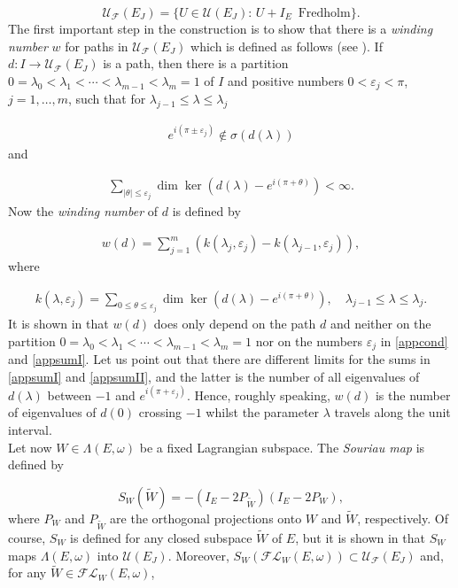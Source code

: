 \documentclass[a4paper,10pt]{article}
\begin{document}
\[\mathcal{U}_{\mathcal{F}}(E_J)=\{U\in \mathcal{U}(E_J):\, U+I_E\,\,\,\text{Fredholm}\}.\]  
The first important step in the construction is to show that there is a \textit{winding number} $w$ for paths in $\mathcal{U}_{\mathcal{F}}(E_J)$ which is defined as follows (see \cite[\S 2.1]{Furutani}). If $d:I\rightarrow \mathcal{U}_{\mathcal{F}}(E_J)$ is a path, then there is a partition $0=\lambda_0<\lambda_1<\cdots<\lambda_{m-1}<\lambda_m=1$ of $I$ and positive numbers $0<\varepsilon_j<\pi$, $j=1,\ldots,m$, such that for $\lambda_{j-1}\leq \lambda\leq \lambda_j$

\begin{align}\label{appcond}
e^{i(\pi\pm\varepsilon_j)}\notin\sigma(d(\lambda))
\end{align}
and

\begin{align}\label{appsumI}
\sum_{|\theta|\leq\varepsilon_j}{\dim\ker(d(\lambda)-e^{i(\pi+\theta)})}<\infty.
\end{align}
Now the \textit{winding number} of $d$ is defined by

\begin{align}\label{winding}
w(d)=\sum^m_{j=1}{(k(\lambda_j,\varepsilon_j)-k(\lambda_{j-1},\varepsilon_j))},
\end{align}
where

\begin{align}\label{appsumII}
k(\lambda,\varepsilon_j)=\sum_{0\leq\theta\leq\varepsilon_j}\dim\ker(d(\lambda)-e^{i(\pi+\theta)}),\quad \lambda_{j-1}\leq \lambda\leq \lambda_j.
\end{align}
It is shown in \cite[Prop. 2.3]{Furutani} that $w(d)$ does only depend on the path $d$ and neither on the partition $0=\lambda_0<\lambda_1<\cdots<\lambda_{m-1}<\lambda_m=1$ nor on the numbers $\varepsilon_j$ in \eqref{appcond} and \eqref{appsumI}. Let us point out that there are different limits for the sums in \eqref{appsumI} and \eqref{appsumII}, and the latter is the number of all eigenvalues of $d(\lambda)$ between $-1$ and $e^{i(\pi+\varepsilon_j)}$. Hence, roughly speaking, $w(d)$ is the number of eigenvalues of $d(0)$ crossing $-1$ whilst the parameter $\lambda$ travels along the unit interval.\\
Let now $W\in\Lambda(E,\omega)$ be a fixed Lagrangian subspace. The \textit{Souriau map} is defined by

\[S_W(\tilde{W})=-(I_E-2P_{\tilde{W}})(I_E-2P_W),\]
where $P_W$ and $P_{\tilde{W}}$ are the orthogonal projections onto $W$ and $\tilde{W}$, respectively. Of course, $S_W$ is defined for any closed subspace $\tilde{W}$ of $E$, but it is shown in \cite[\S 1.5]{Furutani} that $S_W$ maps $\Lambda(E,\omega)$ into $\mathcal{U}(E_J)$. Moreover, $S_W(\mathcal{FL}_W(E,\omega))\subset \mathcal{U}_{\mathcal{F}}(E_J)$ and, for any $\tilde{W}\in\mathcal{FL}_W(E,\omega)$,
\end{document}
